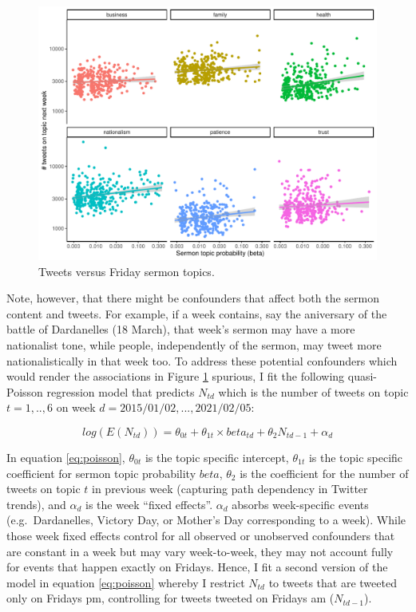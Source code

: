 \documentclass[
  12pt,
]{article}
\begin{document}
\begin{figure}

{\centering \includegraphics{Khutbas_files/figure-latex/fig-7-1} 

}

\caption{Tweets versus Friday sermon topics.}\label{fig:fig-7}
\end{figure}

Note, however, that there might be confounders that affect both the sermon content and tweets. For example, if a week contains, say the aniversary of the battle of Dardanelles (18 March), that week's sermon may have a more nationalist tone, while people, independently of the sermon, may tweet more nationalistically in that week too. To address these potential confounders which would render the associations in Figure \ref{fig:fig-7} spurious, I fit the following quasi-Poisson regression model that predicts \(N_{td}\) which is the number of tweets on topic \(t = 1,..,6\) on week \(d = 2015/01/02,...,2021/02/05\):

\begin{equation}
log(E(N_{td})) = \theta_{0t} + \theta_{1t}\times beta_{td} + \theta_{2}N_{td-1} + \alpha_d \label{eq:poisson}
\end{equation}

In equation \eqref{eq:poisson}, \(\theta_{0t}\) is the topic specific intercept, \(\theta_{1t}\) is the topic specific coefficient for sermon topic probability \(beta\), \(\theta_2\) is the coefficient for the number of tweets on topic \(t\) in previous week (capturing path dependency in Twitter trends), and \(\alpha_d\) is the week ``fixed effects''. \(\alpha_d\) absorbs week-specific events (e.g.~Dardanelles, Victory Day, or Mother's Day corresponding to a week). While those week fixed effects control for all observed or unobserved confounders that are constant in a week but may vary week-to-week, they may not account fully for events that happen exactly on Fridays. Hence, I fit a second version of the model in equation \eqref{eq:poisson} whereby I restrict \(N_{td}\) to tweets that are tweeted only on Fridays pm, controlling for tweets tweeted on Fridays am (\(N_{td-1}\)).
\end{document}
